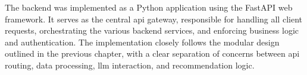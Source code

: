 The backend was implemented as a Python application using the FastAPI web framework. It serves as the central \acs{api} gateway, responsible for handling all client requests, orchestrating the various backend services, and enforcing business logic and authentication. The implementation closely follows the modular design outlined in the previous chapter, with a clear separation of concerns between \acs{api} routing, data processing, \ac{llm} interaction, and recommendation logic.